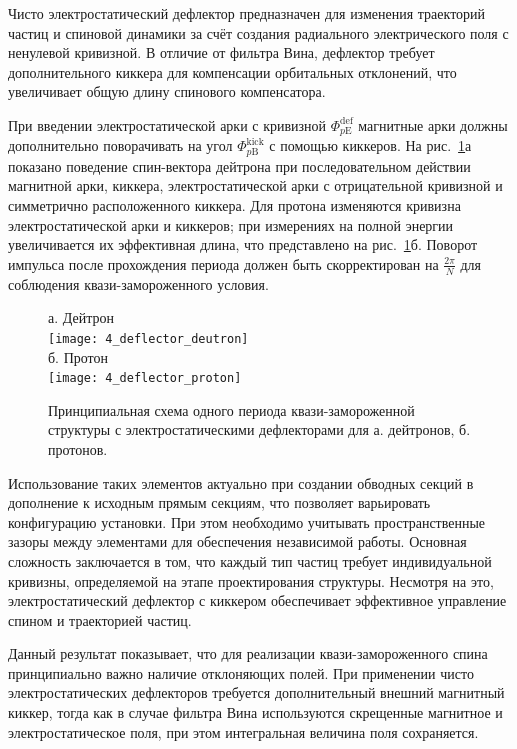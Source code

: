 \par Чисто электростатический дефлектор предназначен для изменения траекторий частиц и спиновой динамики за счёт создания радиального электрического поля с ненулевой кривизной. В отличие от фильтра Вина, дефлектор требует дополнительного киккера для компенсации орбитальных отклонений, что увеличивает общую длину спинового компенсатора.

\par При введении электростатической арки с кривизной $\Phi_{p\textrm{E}}^{\textrm{def}}$ магнитные арки должны дополнительно поворачивать на угол $\Phi_{p\textrm{B}}^{\textrm{kick}}$ с помощью киккеров. На рис.~\ref{fig:4_arc_B_E}а показано поведение спин-вектора дейтрона при последовательном действии магнитной арки, киккера, электростатической арки с отрицательной кривизной и симметрично расположенного киккера. Для протона изменяются кривизна электростатической арки и киккеров; при измерениях на полной энергии увеличивается их эффективная длина, что представлено на рис.~\ref{fig:4_arc_B_E}б. Поворот импульса после прохождения периода должен быть скорректирован на $\frac{2\pi}{N}$ для соблюдения квази-замороженного условия.

\begin{figure} [h!]
	\centering
	а. Дейтрон\\
	\texttt{[image: 4\_deflector\_deutron]}\\
	б. Протон\\
	\texttt{[image: 4\_deflector\_proton]}
	\caption{Принципиальная схема одного периода квази-замороженной структуры с электростатическими дефлекторами для а. дейтронов, б. протонов.}
	\label{fig:4_arc_B_E}
\end{figure}

\par Использование таких элементов актуально при создании обводных секций в дополнение к исходным прямым секциям, что позволяет варьировать конфигурацию установки. При этом необходимо учитывать пространственные зазоры между элементами для обеспечения независимой работы. Основная сложность заключается в том, что каждый тип частиц требует индивидуальной кривизны, определяемой на этапе проектирования структуры. Несмотря на это, электростатический дефлектор с киккером обеспечивает эффективное управление спином и траекторией частиц.
\newline
\par Данный результат показывает, что для реализации квази-замороженного спина принципиально важно наличие отклоняющих полей. При применении чисто электростатических дефлекторов требуется дополнительный внешний магнитный киккер, тогда как в случае фильтра Вина используются скрещенные магнитное и электростатическое поля, при этом интегральная величина поля сохраняется.

